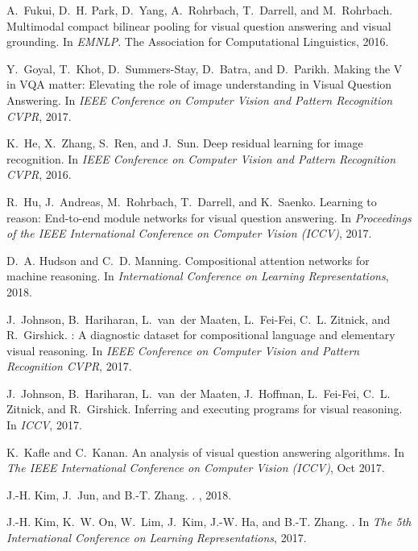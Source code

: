 \documentclass[10pt,twocolumn,letterpaper]{article}
\begin{document}
\begin{thebibliography}{10}
A.~Fukui, D.~H. Park, D.~Yang, A.~Rohrbach, T.~Darrell, and M.~Rohrbach.
\newblock Multimodal compact bilinear pooling for visual question answering and
  visual grounding.
\newblock In {\em EMNLP}. The Association for Computational Linguistics, 2016.

Y.~Goyal, T.~Khot, D.~Summers{-}Stay, D.~Batra, and D.~Parikh.
\newblock Making the {V} in {VQA} matter: Elevating the role of image
  understanding in {V}isual {Q}uestion {A}nswering.
\newblock In {\em {IEEE} Conference on Computer Vision and Pattern Recognition
  {CVPR}}, 2017.

K.~He, X.~Zhang, S.~Ren, and J.~Sun.
\newblock Deep residual learning for image recognition.
\newblock In {\em {IEEE} Conference on Computer Vision and Pattern Recognition
  {CVPR}}, 2016.

R.~Hu, J.~Andreas, M.~Rohrbach, T.~Darrell, and K.~Saenko.
\newblock Learning to reason: End-to-end module networks for visual question
  answering.
\newblock In {\em Proceedings of the IEEE International Conference on Computer
  Vision (ICCV)}, 2017.

D.~A. Hudson and C.~D. Manning.
\newblock Compositional attention networks for machine reasoning.
\newblock In {\em International Conference on Learning Representations}, 2018.

J.~Johnson, B.~Hariharan, L.~van~der Maaten, L.~Fei-Fei, C.~L. Zitnick, and
  R.~Girshick.
: A diagnostic dataset for compositional language and
  elementary visual reasoning.
\newblock In {\em {IEEE} Conference on Computer Vision and Pattern Recognition
  {CVPR}}, 2017.

J.~Johnson, B.~Hariharan, L.~van~der Maaten, J.~Hoffman, L.~Fei-Fei, C.~L.
  Zitnick, and R.~Girshick.
\newblock Inferring and executing programs for visual reasoning.
\newblock In {\em ICCV}, 2017.

K.~Kafle and C.~Kanan.
\newblock An analysis of visual question answering algorithms.
\newblock In {\em The IEEE International Conference on Computer Vision (ICCV)},
  Oct 2017.

J.-H. Kim, J.~Jun, and B.-T. Zhang.
.
, 2018.

J.-H. Kim, K.~W. On, W.~Lim, J.~Kim, J.-W. Ha, and B.-T. Zhang.
.
\newblock In {\em The 5th International Conference on Learning
  Representations}, 2017.


\end{thebibliography}
\end{document}
